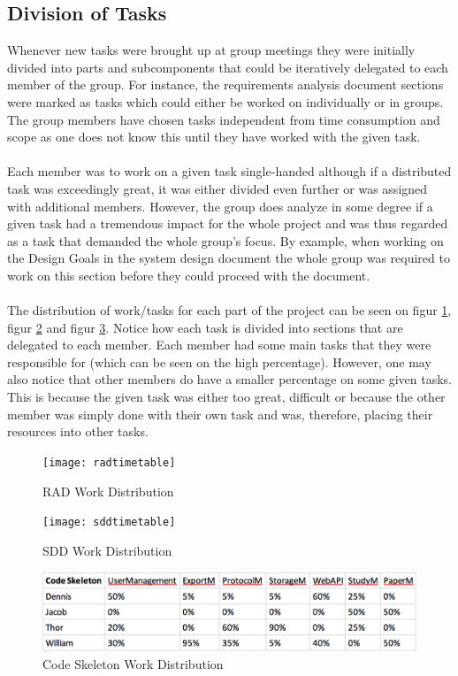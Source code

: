 \subsection{Division of Tasks}
Whenever new tasks were brought up at group meetings they were initially divided into parts and subcomponents that could be iteratively delegated to each member of the group. For instance, the requirements analysis document sections were marked as tasks which could either be worked on individually or in groups. The group members have chosen tasks independent from time consumption and scope as one does not know this until they have worked with the given task.\\\\ Each member was to work on a given task single-handed although if a distributed task was exceedingly great, it was either divided even further or was assigned with additional members. However, the group does analyze in some degree if a given task had a tremendous impact  for the whole project and was thus regarded as a task that demanded the whole group's focus. By example, when working on the Design Goals in the system design document the whole group was required to work on this section before they could proceed with the document. \\\\The distribution of work/tasks for each part of the project can be seen on figur \ref{fig:rad}, figur \ref{fig:sdd} and figur \ref{fig:codeskeleton}. Notice how each task is divided into sections that are delegated to each member. Each member had some main tasks that they were responsible for (which can be seen on the high percentage). However, one may also notice that other members do have a smaller percentage on some given tasks. This is because the given task was either too great, difficult or because the other member was simply done with their own task and was, therefore, placing their resources into other tasks.


\begin{figure}[H]
	\centering
	\texttt{[image: radtimetable]}
	\caption{RAD Work Distribution}
	\label{fig:rad}
\end{figure}

\begin{figure}[H]
	\centering
	\texttt{[image: sddtimetable]}
	\caption{SDD Work Distribution}
	\label{fig:sdd}
\end{figure}

\begin{figure}[H]
	\centering
	\includegraphics[width=150mm]{image/skeletontimetable}
	\caption{Code Skeleton Work Distribution}
	\label{fig:codeskeleton} %
\end{figure}
